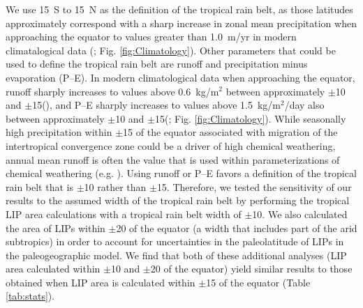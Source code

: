 \documentclass[11pt,letterpaper]{article}
\begin{document}
We use 15\textdegree~S to 15\textdegree~N as the definition of the tropical rain belt, as those latitudes approximately correspond with a sharp increase in zonal mean precipitation when approaching the equator to values greater than 1.0~m/yr in modern climatalogical data (\citealp{Kalnay1996a}; Fig. \ref{fig:Climatology}). Other parameters that could be used to define the tropical rain belt are runoff and precipitation minus evaporation (P--E). In modern climatological data when approaching the equator, runoff sharply increases to values above 0.6~kg/m$^{2}$ between approximately $\pm$10\textdegree\xspace and $\pm$15\textdegree\xspace (\citealp{Kalnay1996a}), and P--E sharply increases to values above 1.5~kg/m$^{2}$/day also between approximately $\pm$10\textdegree\xspace and $\pm$15\textdegree\xspace (\citealp{Trenberth2011a}; Fig. \ref{fig:Climatology}). While seasonally high precipitation within $\pm$15\textdegree\xspace of the equator associated with migration of the intertropical convergence zone could be a driver of high chemical weathering, annual mean runoff is often the value that is used within parameterizations of chemical weathering (e.g. \citealp{West2012a}). Using runoff or P--E favors a definition of the tropical rain belt that is $\pm$10\textdegree\xspace rather than $\pm$15\textdegree\xspace. Therefore, we tested the sensitivity of our results to the assumed width of the tropical rain belt by performing the tropical LIP area calculations with a tropical rain belt width of $\pm$10\textdegree\xspace. We also calculated the area of LIPs within $\pm$20\textdegree\xspace of the equator (a width that includes part of the arid subtropics) in order to account for uncertainties in the paleolatitude of LIPs in the paleogeographic model. We find that both of these additional analyses (LIP area calculated within $\pm$10\textdegree\xspace and $\pm$20\textdegree\xspace of the equator) yield similar results to those obtained when LIP area is calculated within $\pm$15\textdegree\xspace of the equator (Table \ref{tab:stats}).
\end{document}
